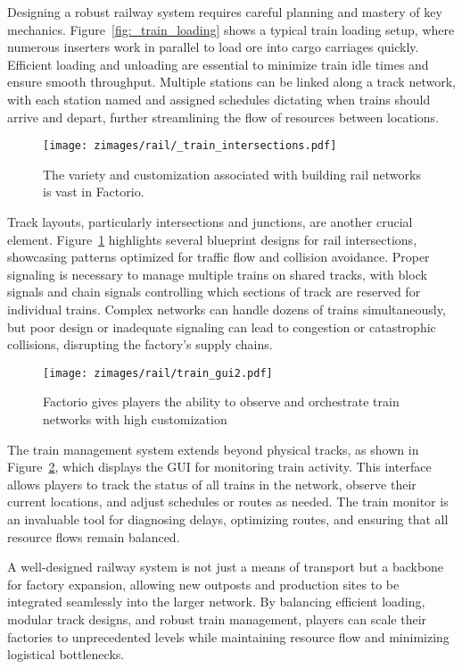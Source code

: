 Designing a robust railway system requires careful planning and mastery of key mechanics. Figure~\ref{fig:_train_loading} shows a typical train loading setup, where numerous inserters work in parallel to load ore into cargo carriages quickly. Efficient loading and unloading are essential to minimize train idle times and ensure smooth throughput. Multiple stations can be linked along a track network, with each station named and assigned schedules dictating when trains should arrive and depart, further streamlining the flow of resources between locations.


\begin{figure}[ht]
    \centering
    \texttt{[image: zimages/rail/\_train\_intersections.pdf]}
    \caption{The variety and customization associated with building rail networks is vast in Factorio. \cite{trainPatterns}}
    \label{fig:_train_intersections}
\end{figure}

Track layouts, particularly intersections and junctions, are another crucial element. Figure~\ref{fig:_train_intersections} highlights several blueprint designs for rail intersections, showcasing patterns optimized for traffic flow and collision avoidance. Proper signaling is necessary to manage multiple trains on shared tracks, with block signals and chain signals controlling which sections of track are reserved for individual trains. Complex networks can handle dozens of trains simultaneously, but poor design or inadequate signaling can lead to congestion or catastrophic collisions, disrupting the factory’s supply chains.

\begin{figure}[ht]
    \centering
    \texttt{[image: zimages/rail/train\_gui2.pdf]}
    \caption{Factorio gives players the ability to observe and orchestrate train networks with high customization \cite{trainGuide}}
    \label{fig:_train_monitor}
\end{figure}

The train management system extends beyond physical tracks, as shown in Figure~\ref{fig:_train_monitor}, which displays the GUI for monitoring train activity. This interface allows players to track the status of all trains in the network, observe their current locations, and adjust schedules or routes as needed. The train monitor is an invaluable tool for diagnosing delays, optimizing routes, and ensuring that all resource flows remain balanced.

A well-designed railway system is not just a means of transport but a backbone for factory expansion, allowing new outposts and production sites to be integrated seamlessly into the larger network. By balancing efficient loading, modular track designs, and robust train management, players can scale their factories to unprecedented levels while maintaining resource flow and minimizing logistical bottlenecks.


